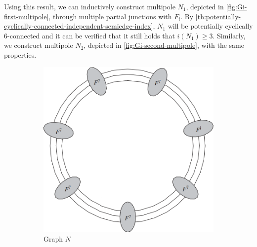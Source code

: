 \documentclass[12pt, twoside]{book}
\begin{document}
\begin{example}
	Using this result, we can inductively construct multipole $N_1$, depicted in \cref{fig:Gi-first-multipole}, through multiple partial junctions with $F_i$. By \cref{th:potentially-cyclically-connected-independent-semiedge-index}, $N_1$ will be potentially cyclically 6-connected and it can be verified that it still holds that $i(N_1)\geq 3$. Similarly, we construct multipole $N_2$, depicted in \cref{fig:Gi-second-multipole}, with the same properties.
	
	\begin{figure}
		\centering
		\begin{subfigure}[b]{0.45\textwidth}
			\centering
			\includegraphics[width=\textwidth]{images/Gi-before-subdivision}
			\caption{Graph $N$}
			\label{fig:Gi-without-middle-before-subdivisions}
		\end{subfigure}
		\hfill
		\begin{subfigure}[b]{0.45\textwidth}
			\centering

\end{subfigure}
\end{figure}
\end{example}
\end{document}
